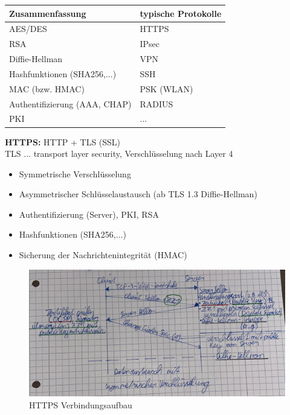 \begin{tabular}{ | p{} | p{} |} \hline
	\textbf{Zusammenfassung} & \textbf{typische Protokolle} \\ \hline
	AES/DES & HTTPS \\
	RSA & IPsec \\
	Diffie-Hellman & VPN \\
	Hashfunktionen (SHA256,...) & SSH \\
	MAC (bzw. HMAC) & PSK (WLAN) \\
	Authentifizierung (AAA, CHAP) & RADIUS \\
	PKI & ... \\
	\hline
\end{tabular} 

\textbf{HTTPS:} HTTP + TLS (SSL) \\
TLS ... transport layer security, Verschlüsselung nach Layer 4
\begin{itemize}
	\item Symmetrische Verschlüsselung
	\item Asymmetrischer Schlüsselaustausch (ab TLS 1.3 Diffie-Hellman)
	\item Authentifizierung (Server), PKI, RSA
	\item Hashfunktionen (SHA256,...)
	\item Sicherung der Nachrichtenintegrität (HMAC)
\end{itemize}

\begin{figure}[H]
	\centering
	\includegraphics[width=1.0\linewidth]{figures/https.jpeg}
	\caption{HTTPS Verbindungsaufbau}
\end{figure}









